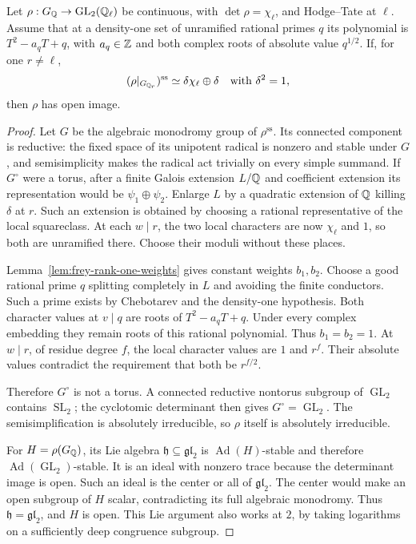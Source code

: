\begin{proposition}\label{prop:frey-weight-open-image}
Let \(\rho:G_\mathbb Q\to\operatorname{GL}_2(\mathbb Q_\ell)\) be continuous, with
\(\det\rho=\chi_\ell\), and Hodge--Tate at \(\ell\).
Assume that at a density-one set of unramified rational primes \(q\)
its polynomial is \(T^2-a_qT+q\), with \(a_q\in\mathbb Z\) and both complex
roots of absolute value \(q^{1/2}\).
If, for one \(r\ne\ell\),
\[
 (\rho|_{G_{\mathbb Q_r}})^{\mathrm{ss}}\simeq\delta\chi_\ell\oplus\delta
 \quad\text{with }\delta^2=1,
\]
then \(\rho\) has open image.
\end{proposition}
\begin{proof}
Let \(G\) be the algebraic monodromy group of \(\rho^{\mathrm{ss}}\).
Its connected component is reductive: the fixed space of its unipotent
radical is nonzero and stable under \(G\), and semisimplicity makes
the radical act trivially on every simple summand.
If \(G^\circ\) were a torus, after a finite Galois extension \(L/\mathbb Q\)
and coefficient extension its representation would be
\(\psi_1\oplus\psi_2\).
Enlarge \(L\) by a quadratic extension of \(\mathbb Q\) killing \(\delta\)
at \(r\). Such an extension is obtained by choosing a rational
representative of the local squareclass.
At each \(w\mid r\), the two local characters are now
\(\chi_\ell\) and \(1\), so both are unramified there.
Choose their moduli without these places.

Lemma~\ref{lem:frey-rank-one-weights} gives constant weights \(b_1,b_2\).
Choose a good rational prime \(q\) splitting completely in \(L\) and
avoiding the finite conductors. Such a prime exists by Chebotarev and
the density-one hypothesis.
Both character values at \(v\mid q\) are roots of
\(T^2-a_qT+q\). Under every complex embedding they remain roots of
this rational polynomial. Thus \(b_1=b_2=1\).
At \(w\mid r\), of residue degree \(f\), the local character values
are \(1\) and \(r^f\). Their absolute values contradict the requirement
that both be \(r^{f/2}\).

Therefore \(G^\circ\) is not a torus. A connected reductive nontorus
subgroup of \(\operatorname{GL}_2\) contains \(\operatorname{SL}_2\); the cyclotomic determinant
then gives \(G^\circ=\operatorname{GL}_2\).
The semisimplification is absolutely irreducible, so \(\rho\) itself
is absolutely irreducible.

For \(H=\rho(G_\mathbb Q)\), its Lie algebra \(\mathfrak h\subseteq
\mathfrak{gl}_2\) is \(\operatorname{Ad}(H)\)-stable and therefore
\(\operatorname{Ad}(\operatorname{GL}_2)\)-stable. It is an ideal with nonzero trace because the
determinant image is open. Such an ideal is the center or all of
\(\mathfrak{gl}_2\).
The center would make an open subgroup of \(H\) scalar, contradicting
its full algebraic monodromy. Thus \(\mathfrak h=\mathfrak{gl}_2\),
and \(H\) is open. This Lie argument also works at \(2\), by taking
logarithms on a sufficiently deep congruence subgroup.
\end{proof}

